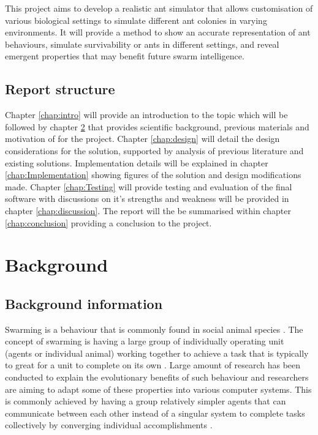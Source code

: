 \documentclass[a4paper, oneside, 11pt]{report}
\begin{document}
This project aims to develop a realistic ant simulator that allows customisation of various biological settings to simulate different ant colonies in varying environments. It will provide a method to show an accurate representation of ant behaviours, simulate survivability or ants in different settings, and reveal emergent properties that may benefit future swarm intelligence.

\section{Report structure}
Chapter \ref{chap:intro} will provide an introduction to the topic which will be followed by chapter \ref{chap:background} that provides scientific background, previous materials and motivation of for the project. Chapter \ref{chap:design} will detail the design considerations for the solution, supported by analysis of previous literature and existing solutions. Implementation details will be explained in chapter \ref{chap:Implementation} showing figures of the solution and design modifications made. Chapter \ref{chap:Testing} will provide testing and evaluation of the final software with discussions on it's strengths and weakness will be provided in chapter \ref{chap:discussion}. The report will the be summarised within chapter \ref{chap:conclusion} providing a conclusion to the project.

\chapter{Background}
\label{chap:background}
\section{Background information}
Swarming is a behaviour that is commonly found in social animal species \citep{Swarm_Animals}. The concept of swarming is having a large group of individually operating unit (agents or individual animal) working together to achieve a task that is typically to great for a unit to complete on its own \citep{Swarm_Explanation}. Large amount of research has been conducted to explain the evolutionary benefits of such behaviour and researchers are aiming to adapt some of these properties into various computer systems. This is commonly achieved by having a group relatively simpler agents that can communicate between each other instead of a singular system to complete tasks collectively by converging individual accomplishments \citep{Swarm_Properties}.
\end{document}
